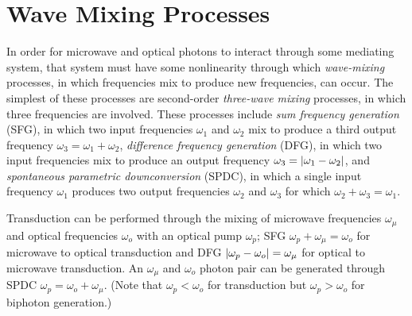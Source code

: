 \section{Wave Mixing Processes}
In order for microwave and optical photons to interact through some mediating system, that system must have some nonlinearity through which \textit{wave-mixing} processes, in which frequencies mix to produce new frequencies, can occur. The simplest of these processes are second-order \textit{three-wave mixing} processes, in which three frequencies are involved. These processes include \textit{sum frequency generation} (SFG), in which two input frequencies $\omega_1$ and $\omega_2$ mix to produce a third output frequency $\omega_3 = \omega_1+\omega_2$, \textit{difference frequency generation} (DFG), in which two input frequencies mix to produce an output frequency $\omega_3 = \left|\omega_1-\omega_2\right|$, and \textit{spontaneous parametric downconversion} (SPDC), in which a single input frequency $\omega_1$ produces two output frequencies $\omega_2$ and $\omega_3$ for which $\omega_2+\omega_3 = \omega_1$.

Transduction can be performed through the mixing of microwave frequencies $\omega_\mu$ and optical frequencies $\omega_o$ with an optical pump $\omega_p$; SFG $\omega_p+\omega_\mu = \omega_o$ for microwave to optical transduction and DFG $\left|\omega_p-\omega_o\right| = \omega_\mu$ for optical to microwave transduction. An $\omega_\mu$ and $\omega_o$ photon pair can be generated through SPDC $\omega_p = \omega_o+\omega_\mu$. (Note that $\omega_p < \omega_o$ for transduction but $\omega_p > \omega_o$ for biphoton generation.)

